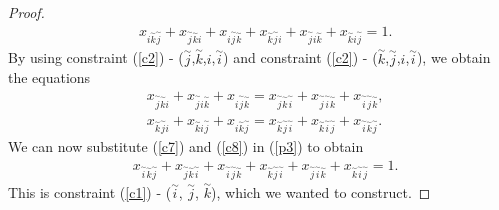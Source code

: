 \begin{proof}
\begin{align}
	&x_{i\overset{\sim}{k}\overset{\sim}{j}} + x_{\overset{\sim}{j}\overset{\sim}{k}i} + x_{i\overset{\sim}{j}\overset{\sim}{k}} + x_{\overset{\sim}{k}\overset{\sim}{j}i} + x_{\overset{\sim}{j}i\overset{\sim}{k}} + x_{\overset{\sim}{k}i\overset{\sim}{j}} = 1. \label{p3}
	\end{align}
	By using constraint (\ref{c2}) - ($\overset{\sim}{j}$,$\overset{\sim}{k}$,$i$,$\overset{\sim}{i}$) and constraint (\ref{c2}) - ($\overset{\sim}{k}$,$\overset{\sim}{j}$,$i$,$\overset{\sim}{i}$), we obtain the equations
	\begin{align}
	&x_{\overset{\sim}{j}\overset{\sim}{k}i} + x_{\overset{\sim}{j}i\overset{\sim}{k}} + x_{i\overset{\sim}{j}\overset{\sim}{k}} = x_{\overset{\sim}{j}\overset{\sim}{k}\overset{\sim}{i}} + x_{\overset{\sim}{j}\overset{\sim}{i}\overset{\sim}{k}} + x_{\overset{\sim}{i}\overset{\sim}{j}\overset{\sim}{k}},  \label{c7}\\ 
	&x_{\overset{\sim}{k}\overset{\sim}{j}i} + x_{\overset{\sim}{k}i\overset{\sim}{j}} + x_{i\overset{\sim}{k}\overset{\sim}{j}} = x_{\overset{\sim}{k}\overset{\sim}{j}\overset{\sim}{i}} + x_{\overset{\sim}{k}\overset{\sim}{i}\overset{\sim}{j}} + x_{\overset{\sim}{i}\overset{\sim}{k}\overset{\sim}{j}}.  \label{c8}
	\end{align}
	We can now substitute (\ref{c7}) and (\ref{c8}) in (\ref{p3}) to obtain
	\begin{align*}
	&x_{\overset{\sim}{i}\overset{\sim}{k}\overset{\sim}{j}} + x_{\overset{\sim}{j}\overset{\sim}{k}\overset{\sim}{i}} + x_{\overset{\sim}{i}\overset{\sim}{j}\overset{\sim}{k}} + x_{\overset{\sim}{k}\overset{\sim}{j}\overset{\sim}{i}} + x_{\overset{\sim}{j}\overset{\sim}{i}\overset{\sim}{k}} + x_{\overset{\sim}{k}\overset{\sim}{i}\overset{\sim}{j}} = 1.
	\end{align*}
	This is constraint (\ref{c1}) - ($\overset{\sim}{i}$, $\overset{\sim}{j}$, $\overset{\sim}{k}$), which we wanted to construct.
\end{proof}

\newpage

